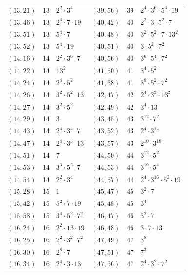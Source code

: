 \documentclass[11pt]{article}
\begin{document}
\begin{longtable}{@{}lrl@{\qquad}lrl@{}}
$(13,21)$ & 13 & $2^{2}\cdot 3^{4}$ & $(39,56)$ & 39 & $2^{4}\cdot 3^{6}\cdot 5^{4}\cdot 19$\\
$(13,46)$ & 13 & $2^{4}\cdot 7\cdot 19$ & $(40,42)$ & 40 & $2^{2}\cdot 3\cdot 5^{2}\cdot 7$\\
$(13,51)$ & 13 & $5^{4}\cdot 7$ & $(40,48)$ & 40 & $3^{2}\cdot 5^{2}\cdot 7\cdot 13^{2}$\\
$(13,52)$ & 13 & $5^{4}\cdot 19$ & $(40,51)$ & 40 & $3\cdot 5^{2}\cdot 7^{2}$\\
$(14,16)$ & 14 & $2^{2}\cdot 3^{6}\cdot 7$ & $(40,56)$ & 40 & $3^{6}\cdot 5^{4}\cdot 7^{2}$\\
$(14,22)$ & 14 & $13^{2}$ & $(41,50)$ & 41 & $3^{4}\cdot 5^{2}$\\
$(14,24)$ & 14 & $2^{4}\cdot 5^{2}$ & $(41,58)$ & 41 & $3^{8}\cdot 5^{2}\cdot 7^{2}$\\
$(14,26)$ & 14 & $3^{2}\cdot 5^{2}\cdot 13$ & $(42,47)$ & 42 & $2^{4}\cdot 3^{3}\cdot 13^{2}$\\
$(14,27)$ & 14 & $3^{2}\cdot 5^{2}$ & $(42,49)$ & 42 & $3^{4}\cdot 13$\\
$(14,29)$ & 14 & $3$ & $(43,45)$ & 43 & $3^{12}\cdot 7^{2}$\\
$(14,43)$ & 14 & $2^{4}\cdot 3^{4}\cdot 7$ & $(43,52)$ & 43 & $2^{4}\cdot 3^{14}$\\
$(14,47)$ & 14 & $2^{4}\cdot 3^{3}\cdot 13$ & $(43,57)$ & 43 & $2^{10}\cdot 3^{18}$\\
$(14,51)$ & 14 & $7$ & $(44,50)$ & 44 & $3^{12}\cdot 5^{2}$\\
$(14,53)$ & 14 & $3^{3}\cdot 5^{2}\cdot 7$ & $(44,53)$ & 44 & $3^{10}\cdot 5^{4}$\\
$(14,54)$ & 14 & $2^{2}\cdot 3^{4}$ & $(44,57)$ & 44 & $2^{4}\cdot 3^{16}\cdot 5^{2}\cdot 19$\\
$(15,28)$ & 15 & $1$ & $(45,47)$ & 45 & $3^{2}\cdot 7$\\
$(15,42)$ & 15 & $5^{2}\cdot 7\cdot 19$ & $(45,48)$ & 45 & $3^{4}$\\
$(15,58)$ & 15 & $3^{4}\cdot 5^{2}\cdot 7^{2}$ & $(46,47)$ & 46 & $3^{2}\cdot 7$\\
$(16,24)$ & 16 & $2^{2}\cdot 13\cdot 19$ & $(46,48)$ & 46 & $3\cdot 7\cdot 13$\\
$(16,25)$ & 16 & $2^{2}\cdot 3^{2}\cdot 7^{2}$ & $(47,49)$ & 47 & $3^{8}$\\
$(16,30)$ & 16 & $2^{8}\cdot 7$ & $(47,51)$ & 47 & $7^{3}$\\
$(16,34)$ & 16 & $2^{4}\cdot 3\cdot 13$ & $(47,56)$ & 47 & $2^{4}\cdot 3^{2}\cdot 7^{2}$\\

\end{longtable}
\end{document}
